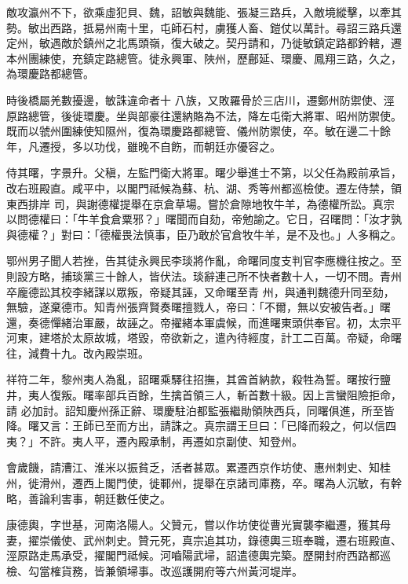 \begin{pinyinscope}
 敵攻瀛州不下，欲乘虛犯貝、魏，詔敏與魏能、張凝三路兵，入敵境縱擊，以牽其勢。敏出西路，抵易州南十里，屯師石村，虜獲人畜、鎧仗以萬計。尋詔三路兵還定州，敏遇敵於鎮州之北馬頭嶺，復大破之。契丹請和，乃徙敏鎮定路都鈐轄，遷本州團練使，充鎮定路總管。徙永興軍、陜州，歷鄜延、環慶、鳳翔三路，久之，為環慶路都總管。



 時後橋屬羌數擾邊，敏誅違命者十
 八族，又敗羅骨於三店川，遷鄭州防禦使、涇原路總管，後徙環慶。坐與部豪往還納賂為不法，降左屯衛大將軍、昭州防禦使。既而以虢州圍練使知隰州，復為環慶路都總管、儀州防禦使，卒。敏在邊二十餘年，凡遷授，多以功伐，雖晚不自飭，而朝廷亦優容之。



 侍其曙，字景升。父稹，左監門衛大將軍。曙少舉進士不第，以父任為殿前承旨，改右班殿直。咸平中，以閣門祗候為蘇、杭、湖、秀等州都巡檢使。遷左侍禁，領東西排岸
 司，與謝德權提舉在京倉草場。嘗於倉隙地牧牛羊，為德權所訟。真宗以問德權曰：「牛羊食倉粟邪？」曙聞而自劾，帝勉諭之。它日，召曙問：「汝才孰與德權？」對曰：「德權畏法慎事，臣乃敢於官倉牧牛羊，是不及也。」人多稱之。



 鄂州男子聞人若挫，告其徒永興民李琰將作亂，命曙同度支判官李應機往按之。至則設方略，捕琰黨三十餘人，皆伏法。琰辭連己所不快者數十人，一切不問。青州卒龐德訟其校李緒謀以眾叛，帝疑其誣，又命曙至青
 州，與通判魏德升同至劾，無驗，遂棄德市。知青州張齊賢奏曙擅戮人，帝曰：「不爾，無以安被告者。」曙還，奏德憚緒治軍嚴，故誣之。帝擢緒本軍虞候，而進曙東頭供奉官。初，太宗平河東，建塔於太原故城，塔毀，帝欲新之，遣內待經度，計工二百萬。帝疑，命曙往，減費十九。改內殿崇班。



 祥符二年，黎州夷人為亂，詔曙乘驛往招撫，其酋首納款，殺牲為誓。曙按行鹽井，夷人復叛。曙率部兵百餘，生擒首領三人，斬首數十級。因上言蠻阻險拒命，請
 必加討。詔知慶州孫正辭、環慶駐泊都監張繼勛領陜西兵，同曙俱進，所至皆降。曙又言：王師已至而方出，請誅之。真宗謂王旦曰：「已降而殺之，何以信四夷？」不許。夷人平，遷內殿承制，再遷如京副使、知登州。



 會歲饑，請漕江、淮米以振貧乏，活者甚眾。累遷西京作坊使、惠州刺史、知桂州，徙滑州，遷西上閣門使，徙鄆州，提舉在京諸司庫務，卒。曙為人沉敏，有幹略，善論利害事，朝廷數任使之。



 康德輿，字世基，河南洛陽人。父贊元，嘗以作坊使從曹光實襲李繼遷，獲其母妻，擢崇儀使、武州刺史。贊元死，真宗追其功，錄德輿三班奉職，遷右班殿直、涇原路走馬承受，擢閣門祗候。河嚙陽武埽，詔遣德輿完築。歷開封府西路都巡檢、勾當榷貨務，皆兼領埽事。改巡護開府等六州黃河堤岸。




\end{pinyinscope}
